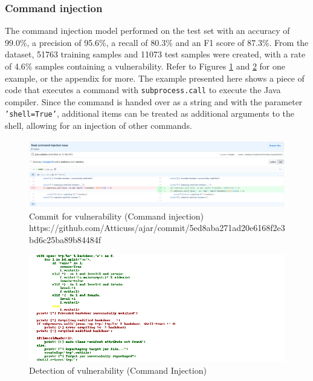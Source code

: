 \documentclass[
a4paper,
pagesize,
pdftex,
12pt,
twoside, %
BCOR=5mm, %
ngerman,
fleqn,
final,
]{scrartcl}
\begin{document}
	\subsubsection{Command injection}
	The command injection model performed on the test set with an accuracy of 99.0\%, a precision of 95.6\%, a recall of 80.3\% and an F1 score of 87.3\%. From the dataset, 51763 training samples and 11073 test samples were created, with a rate of 4.6\% samples containing a vulnerability. Refer to Figures \ref{fig:command_injectionB} and \ref{fig:command_injectionBr} for one example, or the appendix for more. The example presented here shows a piece of code that executes a command with \texttt{subprocess.call} to execute the Java compiler. Since the command is handed over as a string and with the parameter \texttt{'shell=True'}, additional items can be treated as additional arguments to the shell, allowing for an injection of other commands.
	
	\begin{figure}[H]
		\centering
		\includegraphics[width=\linewidth]{Images/command_injectionB}
		\caption{Commit for vulnerability (Command injection) \newline \scriptsize{https://github.com/Atticuss/ajar/commit/5ed8aba271ad20e6168f2e3bd6c25ba89b84484f}}
		\label{fig:command_injectionB}
	\end{figure}
	\begin{figure}[H]
		\centering
		\includegraphics[width=\linewidth]{Images/command_injectionBr}
		\caption{Detection of vulnerability (Command Injection)}
		\label{fig:command_injectionBr}
	\end{figure}
	
\end{document}
